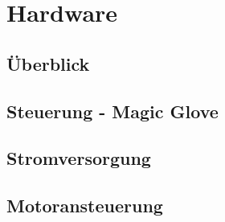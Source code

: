 \chapter{Hardware}

\section{Überblick}
\section{Steuerung - Magic Glove}
\section{Stromversorgung}
\section{Motoransteuerung}

